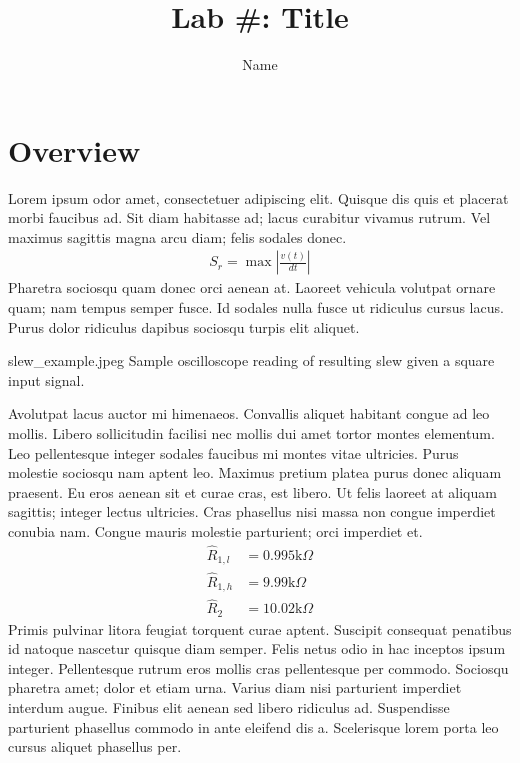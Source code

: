 \documentclass[stu,12pt,floatsintext]{apa7}
\title{Lab #: Title } %
\author{Name}
\affiliation{University of California \- Santa Cruz, Jack Baskin School of Engineering}
\begin{document}



\maketitle %

\section{Overview}

Lorem ipsum odor amet, consectetuer adipiscing elit. Quisque dis quis et placerat morbi faucibus ad. Sit diam habitasse ad; lacus curabitur vivamus rutrum. Vel maximus sagittis magna arcu diam; felis sodales donec. 
\begin{align}
  S_{r} = \max \left|\frac{v(t)}{dt}\right|
\end{align}
\noindent Pharetra sociosqu quam donec orci aenean at. Laoreet vehicula volutpat ornare quam; nam tempus semper fusce. Id sodales nulla fusce ut ridiculus cursus lacus. Purus dolor ridiculus dapibus sociosqu turpis elit aliquet.

{slew_example.jpeg}
{Sample oscilloscope reading of resulting slew given a square input signal.}

Avolutpat lacus auctor mi himenaeos. Convallis aliquet habitant congue ad leo mollis. Libero sollicitudin facilisi nec mollis dui amet tortor montes elementum. Leo pellentesque integer sodales faucibus mi montes vitae ultricies. Purus molestie sociosqu nam aptent leo. Maximus pretium platea purus donec aliquam praesent. Eu eros aenean sit et curae cras, est libero. Ut felis laoreet at aliquam sagittis; integer lectus ultricies. Cras phasellus nisi massa non congue imperdiet conubia nam. Congue mauris molestie parturient; orci imperdiet et.
\begin{align}
  \hat{R}_{1,l} &= 0.995 \text{k}\Omega\\
  \hat{R}_{1,h} &= 9.99 \text{k}\Omega\\
  \hat{R}_{2}   &= 10.02 \text{k}\Omega
\end{align}
Primis pulvinar litora feugiat torquent curae aptent. Suscipit consequat penatibus id natoque nascetur quisque diam semper. Felis netus odio in hac inceptos ipsum integer. Pellentesque rutrum eros mollis cras pellentesque per commodo. Sociosqu pharetra amet; dolor et etiam urna. Varius diam nisi parturient imperdiet interdum augue. Finibus elit aenean sed libero ridiculus ad. Suspendisse parturient phasellus commodo in ante eleifend dis a. Scelerisque lorem porta leo cursus aliquet phasellus per.
\end{document}
